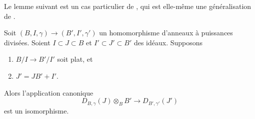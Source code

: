 \noindent
Le lemme suivant est un cas particulier de
\cite[Proposition 2.1.7]{dJ-crystalline}, qui est elle-même une généralisation de
\cite[Proposition 2.8.2]{Berthelot}.

\begin{lemma}
\label{lemma-flat-extension-divided-power-envelope}
Soit $(B, I, \gamma) \to (B', I', \gamma')$ un homomorphisme d'anneaux à
puissances divisées. Soient $I \subset J \subset B$ et
$I' \subset J' \subset B'$ des idéaux. Supposons
\begin{enumerate}
\item $B/I \to B'/I'$ soit plat, et
\item $J' = JB' + I'$.
\end{enumerate}
Alors l'application canonique
$$
D_{B, \gamma}(J) \otimes_B B' \longrightarrow D_{B', \gamma'}(J')
$$
est un isomorphisme.
\end{lemma}

